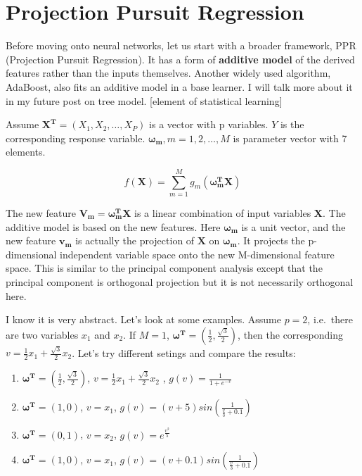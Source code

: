 \documentclass[]{book}
\theoremstyle{definition}
\theoremstyle{definition}
\theoremstyle{remark}
\begin{document}
\section{Projection Pursuit
Regression}\label{projection-pursuit-regression}

Before moving onto neural networks, let us start with a broader
framework, PPR (Projection Pursuit Regression). It has a form of
\textbf{additive model} of the derived features rather than the inputs
themselves. Another widely used algorithm, AdaBoost, also fits an
additive model in a base learner. I will talk more about it in my future
post on tree model. {[}element of statistical learning{]}

Assume \(\mathbf{X^{T}}=(X_1,X_2,\dots,X_P)\) is a vector with p
variables. \(Y\) is the corresponding response variable.
\(\mathbf{\omega_{m}},m=1,2,\dots,M\) is parameter vector with 7
elements.

\[f(\mathbf{X})=\sum_{m=1}^{M}g_{m}(\mathbf{\omega_{m}^{T}X})\]

The new feature \(\mathbf{V_{m}}=\mathbf{\omega_{m}^{T}X}\) is a linear
combination of input variables \(\mathbf{X}\). The additive model is
based on the new features. Here \(\mathbf{\omega_{m}}\) is a unit
vector, and the new feature \(\mathbf{v_m}\) is actually the projection
of \(\mathbf{X}\) on \(\mathbf{\omega_{m}}\). It projects the
p-dimensional independent variable space onto the new M-dimensional
feature space. This is similar to the principal component analysis
except that the principal component is orthogonal projection but it is
not necessarily orthogonal here.

I know it is very abstract. Let's look at some examples. Assume \(p=2\),
i.e.~there are two variables \(x_1\) and \(x_2\). If \(M=1\),
\(\mathbf{\omega^{T}}=(\frac{1}{2},\frac{\sqrt{3}}{2})\), then the
corresponding \(v=\frac{1}{2}x_{1}+\frac{\sqrt{3}}{2}x_{2}\). Let's try
different setings and compare the results:

\begin{enumerate}
\def\labelenumi{\arabic{enumi}.}
\item
  \(\mathbf{\omega^{T}}=(\frac{1}{2},\frac{\sqrt{3}}{2})\),
  \(v=\frac{1}{2}x_{1}+\frac{\sqrt{3}}{2}x_{2}\) ,
  \(g(v)=\frac{1}{1+e^{-v}}\)
\item
  \(\mathbf{\omega^{T}}=(1,0)\), \(v = x_1\),
  \(g(v)=(v+5)sin(\frac{1}{\frac{v}{3}+0.1})\)
\item
  \(\mathbf{\omega^{T}}=(0,1)\), \(v = x_2\), \(g(v)=e^{\frac{v^2}{5}}\)
\item
  \(\mathbf{\omega^{T}}=(1,0)\), \(v = x_1\),
  \(g(v)=(v+0.1)sin(\frac{1}{\frac{v}{3}+0.1})\)
\end{enumerate}
\end{document}
